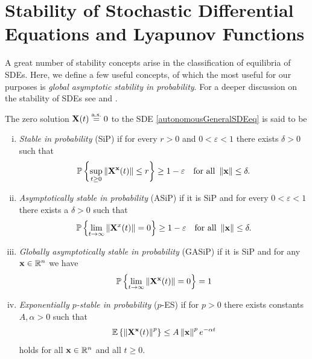 \documentclass[a4paper,12pt,twoside,BCOR=10mm]{scrbook}
\begin{document}
\section{Stability of Stochastic Differential Equations and Lyapunov Functions}\label{SectionStabilitySDE}
A great number of stability concepts arise in the classification of equilibria of SDEs. Here, we define a few useful concepts, of which the most useful for our purposes is \textit{global asymptotic stability in probability}. For a deeper discussion on the stability of SDEs see \citep{mao2007stochastic} and \citep{sdestab2012khaminskii}.

\begin{definition}
The zero solution $\mathbf{X}(t) \stackrel{\text{a.s.}}{=} 0$ to the SDE \eqref{autonomousGeneralSDEeq} is said to be
\begin{enumerate}[i)]
    \item \textit{Stable in probability} (SiP) if for every $r > 0$ and $0 < \varepsilon < 1$ there exists $\delta > 0$ such that
    \begin{align*}
        \mathbb{P}\left\{\sup_{t\geq 0}\left\lVert\mathbf{X}^{\mathbf{x}}(t)\right\rVert\leq r\right\} \geq 1-\varepsilon \quad \text{for all } \left\lVert\mathbf{x}\right\rVert\leq \delta.
    \end{align*}
    \item \textit{Asymptotically stable in probability} (ASiP) if it is SiP and for every $0 < \varepsilon < 1$ there exists a $\delta > 0$ such that
    \begin{align*}
        \mathbb{P}\left\{\lim_{t\to \infty}\left\lVert\mathbf{X}^x(t)\right\rVert = 0\right\} \geq 1 - \varepsilon \quad \text{for all } \left\lVert\mathbf{x}\right\rVert\leq \delta.
    \end{align*}
    \item \textit{Globally asymptotically stable in probability} (GASiP) if it is SiP and for any $\mathbf{x} \in \mathbb{R}^{n}$ we have
    \begin{align*}
        \mathbb{P}\left\{\lim_{t\to \infty} \left\lVert\mathbf{X}^{\mathbf{x}}(t)\right\rVert = 0\right\} = 1
    \end{align*}
    \item \textit{Exponentially $p$-stable in probability} ($p$-ES) if for $p > 0$ there exists constants $A, \alpha > 0$ such that
    \begin{align*}
        \mathbb{E}\left\{\left\lVert\mathbf{X}^{\mathbf{x}}(t)\right\rVert^p \right\} \leq A\left\lVert\mathbf{x}\right\rVert^p e^{-\alpha t}
    \end{align*}
    holds for all $\mathbf{x} \in \mathbb{R}^{n}$ and all $t \geq 0$.
\end{enumerate}
\end{definition}
\end{document}
